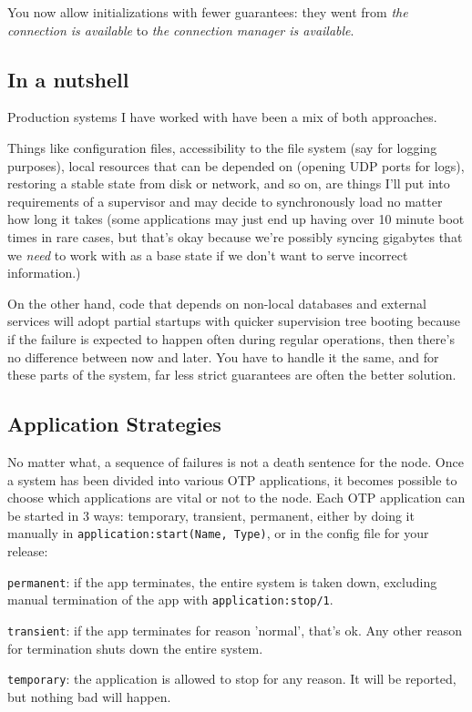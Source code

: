 \documentclass[11pt, oneside]{book}   	%
\newcommand{\function}[1]{\Verb`#1`}
\newcommand{\expression}[1]{\Verb`#1`}
\newcommand{\term}[1]{\Verb`#1`}
\begin{document}
You now allow initializations with fewer guarantees: they went from \emph{the connection is available} to \emph{the connection manager is available}.

\subsection{In a nutshell}
\label{subsec:start-link-in-a-nutshell}

Production systems I have worked with have been a mix of both approaches.

Things like configuration files, accessibility to the file system (say for logging purposes), local resources that can be depended on (opening UDP ports for logs), restoring a stable state from disk or network, and so on, are things I'll put into requirements of a supervisor and may decide to synchronously load no matter how long it takes (some applications may just end up having over 10 minute boot times in rare cases, but that's okay because we're possibly syncing gigabytes that we \emph{need} to work with as a base state if we don't want to serve incorrect information.)

On the other hand, code that depends on non-local databases and external services will adopt partial startups with quicker supervision tree booting because if the failure is expected to happen often during regular operations,
then there's no difference between now and later. You have to handle it the same, and for these parts of the system, far less strict guarantees are often the better solution.

\subsection{Application Strategies}
\label{subsec:start-link-application-strategies}

No matter what, a sequence of failures is not a death sentence for the node. Once a system has been divided into various OTP applications, it becomes possible to choose which applications are vital or not to the node. Each OTP application can be started in 3 ways: temporary, transient, permanent, either by doing it manually in \expression{application:start(Name, Type)}, or in the config file for your release:

\begin{itemize*}
	\item \term{permanent}: if the app terminates, the entire system is taken down, excluding manual termination of the app with \function{application:stop/1}.
	\item \term{transient}: if the app terminates for reason 'normal', that's ok. Any other reason for termination shuts down the entire system.
	\item \term{temporary}: the application is allowed to stop for any reason. It will be reported, but nothing bad will happen.
\end{itemize*}
\end{document}
